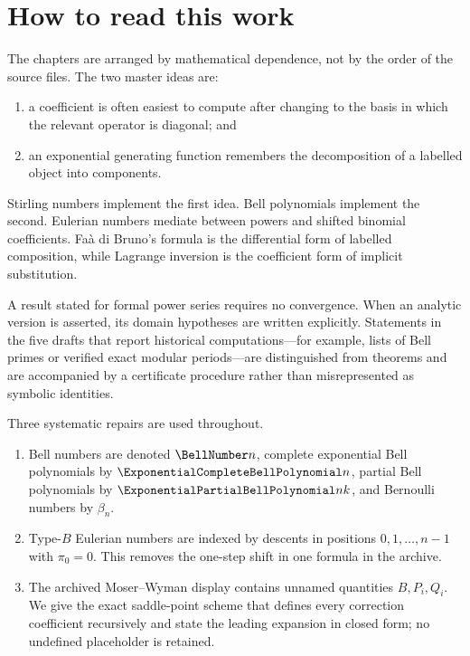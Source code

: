 \documentclass[11pt,a4paper,oneside,openany]{book}
\theoremstyle{definition}
\theoremstyle{remark}
\begin{document}
\chapter*{How to read this work}
The chapters are arranged by mathematical dependence, not by the order of the source
files.  The two master ideas are:
\begin{enumerate}
  \item a coefficient is often easiest to compute after changing to the basis in
        which the relevant operator is diagonal; and
  \item an exponential generating function remembers the decomposition of a
        labelled object into components.
\end{enumerate}
Stirling numbers implement the first idea.  Bell polynomials implement the second.
Eulerian numbers mediate between powers and shifted binomial coefficients.  Fa\`a di
Bruno's formula is the differential form of labelled composition, while Lagrange
inversion is the coefficient form of implicit substitution.

A result stated for formal power series requires no convergence.  When an analytic
version is asserted, its domain hypotheses are written explicitly.  Statements in the five drafts that report historical computations---for example, lists of Bell
primes or verified exact modular periods---are distinguished from theorems and are
accompanied by a certificate procedure rather than misrepresented as symbolic
identities.

\begin{auditbox}
Three systematic repairs are used throughout.
\begin{enumerate}
\item Bell numbers are denoted $\BellNumber n$, complete exponential Bell polynomials by
      $\ExponentialCompleteBellPolynomial n$, partial Bell polynomials by $\ExponentialPartialBellPolynomial nk$, and Bernoulli numbers by
      $\beta_n$.
\item Type-$B$ Eulerian numbers are indexed by descents in positions
      $0,1,\ldots,n-1$ with $\pi_0=0$.  This removes the one-step shift in one formula
      in the archive.
\item The archived Moser--Wyman display contains unnamed quantities
      $B,P_i,Q_i$.  We give the exact saddle-point scheme that defines every
      correction coefficient recursively and state the leading expansion in closed
      form; no undefined placeholder is retained.
\end{enumerate}
\end{auditbox}
\end{document}
